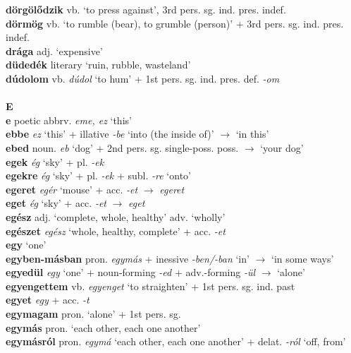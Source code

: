 \documentclass[11pt]{article}
\begin{document}
\textbf{dörgölődzik} vb. `to press against', 3rd
pers. sg. ind. pres. indef. \\
\textbf{dörmög} vb. `to rumble (bear), to grumble (person)' + 3rd
pers. sg. ind. pres. indef. \\
\textbf{drága} adj. `expensive' \\
\textbf{düdedék} literary `ruin, rubble, wasteland' \\
\textbf{dúdolom} vb. \emph{dúdol} `to hum' + 1st
pers. sg. ind. pres. def. \emph{-om} \\
\ \\
\noindent \textbf{\large E} \\
\textbf{e} poetic abbrv. \emph{eme, ez} `this' \\
\textbf{ebbe} \emph{ez} `this' + illative \emph{-be}
`into (the inside of)' $\rightarrow$ `in this' \\
\textbf{ebed} noun. \emph{eb} `dog' + 2nd
pers. sg. single\hyp{}poss. poss. $\rightarrow$ `your dog' \\
\textbf{egek} \emph{ég} `sky' + pl. \emph{-ek} \\
\textbf{egekre} \emph{ég} `sky' + pl. \emph{-ek} + subl. \emph{-re} `onto' \\
\textbf{egeret} \emph{egér} `mouse' + acc. \emph{-et}
$\rightarrow$ \emph{egeret} \\
\textbf{eget} \emph{ég} `sky' + acc. \emph{-et} $\rightarrow$
  \emph{eget} \\
\textbf{egész} adj. `complete, whole, healthy' \textbar\textbar{}
adv. `wholly' \\
\textbf{egészet} \emph{egész} `whole, healthy, complete' +
acc. \emph{-et} \\
\textbf{egy} `one' \\
\textbf{egyben-másban} pron. \emph{egymás} + inessive \emph{-ben/-ban}
`in' $\rightarrow$ `in some ways' \\
\textbf{egyedül} \emph{egy} `one' + noun\hyp{}forming \emph{-ed} +
adv.\hyp{}forming \emph{-ül} $\rightarrow$ `alone' \\
\textbf{egyengettem} vb. \emph{egyenget} `to straighten' + 1st
pers. sg. ind. past \\
\textbf{egyet} \emph{egy} + acc. \emph{-t} \\
\textbf{egymagam} pron. `alone' + 1st pers. sg. \\
\textbf{egymás} pron. `each other, each one another' \\
\textbf{egymásról} pron. \emph{egymá} `each other, each one another' +
delat. \emph{-ról} `off, from' \\
\end{document}
